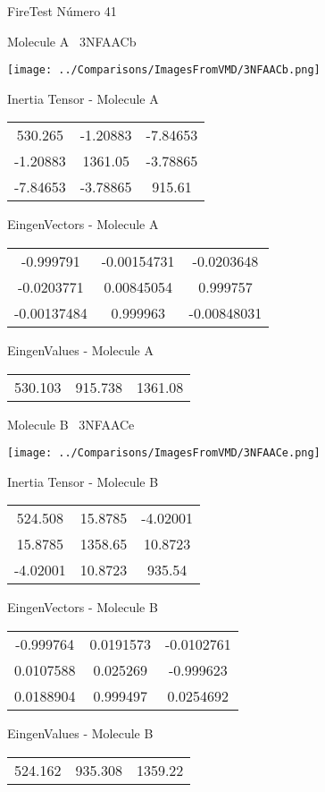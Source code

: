 \vtab[-3cm]
\begin{center}
{\large FireTest \tab Número 41}
\end{center}
\begin{multicols}{2}
\begin{center}

Molecule A \
3NFAACb

\texttt{[image: ../Comparisons/ImagesFromVMD/3NFAACb.png]}

Inertia Tensor - Molecule A \\
\begin{tabular}{|c c c|}
530.265	 & 	-1.20883	 & 	-7.84653	 \\
-1.20883	 & 	1361.05	 & 	-3.78865	 \\
-7.84653	 & 	-3.78865	 & 	915.61
\end{tabular}

\vtab
 EingenVectors - Molecule A     \\
\begin{tabular}{|c c c|}
-0.999791	 & 	-0.00154731	 & 	-0.0203648	 \\
-0.0203771	 & 	0.00845054	 & 	0.999757	 \\
-0.00137484	 & 	0.999963	 & 	-0.00848031
\end{tabular}

\vtab
 EingenValues - Molecule A     \\
\begin{tabular}{|c c c|}
530.103	 & 	915.738	 & 	1361.08	 \\
\end{tabular}
\columnbreak

Molecule B \
3NFAACe

\texttt{[image: ../Comparisons/ImagesFromVMD/3NFAACe.png]}

Inertia Tensor - Molecule B \\
\begin{tabular}{|c c c|}
524.508	 & 	15.8785	 & 	-4.02001	 \\
15.8785	 & 	1358.65	 & 	10.8723	 \\
-4.02001	 & 	10.8723	 & 	935.54
\end{tabular}

\vtab
 EingenVectors - Molecule B     \\
\begin{tabular}{|c c c|}
-0.999764	 & 	0.0191573	 & 	-0.0102761	 \\
0.0107588	 & 	0.025269	 & 	-0.999623	 \\
0.0188904	 & 	0.999497	 & 	0.0254692
\end{tabular}

\vtab
 EingenValues - Molecule B     \\
\begin{tabular}{|c c c|}
524.162	 & 	935.308	 & 	1359.22	 \\
\end{tabular}

\end{center}
\end{multicols}

